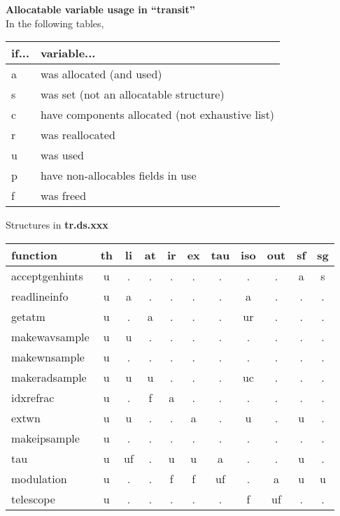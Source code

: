 \documentclass{article}
\begin{document}
\begin{center}
{\large {\bf Allocatable variable usage in ``transit''}}\\
\vfill
In the following tables, \\
\begin{tabular}{ll}
if... & variable...\\
\hline
a & was allocated (and used) \\
s & was set (not an allocatable structure)\\
c & have components allocated (not exhaustive list) \\
r & was reallocated \\
u & was used \\
p & have non-allocables fields in use \\
f & was freed \\
\end{tabular}
\end{center}

\vfill

\begin{center}
{\large Structures in {\bf tr.ds.xxx}}\\[.5cm]
\begin{tabular}{l|cccccccccc}
function
  & th & li & at & ir & ex & tau & iso & out & sf & sg \\
\hline
acceptgenhints
  & u  & .  & .  & .  & .  & .   & .   & .   & a  & s  \\
readlineinfo
  & u  & a  & .  & .  & .  & .   & a   & .   & .  & .  \\
getatm
  & u  & .  & a  & .  & .  & .   & ur  & .   & .  & .  \\
makewavsample
  & u  & u  & .  & .  & .  & .   & .   & .   & .  & .  \\
makewnsample
  & u  & .  & .  & .  & .  & .   & .   & .   & .  & .  \\
makeradsample
  & u  & u  & u  & .  & .  & .   & uc  & .   & .  & .  \\
idxrefrac
  & u  & .  & f  & a  & .  & .   & .   & .   & .  & .  \\
extwn
  & u  & u  & .  & .  & a  & .   & u   & .   & u  & .  \\
makeipsample
  & u  & .  & .  & .  & .  & .   & .   & .   & .  & .  \\
tau
  & u  & uf & .  & u  & u  & a   & .   & .   & u  & .  \\
modulation
  & u  & .  & .  & f  & f  & uf  & .   & a   & u  & u  \\
telescope
  & u  & .  & .  & .  & .  & .   & f   & uf  & .  & .  \\
\hline
\end{tabular}
\end{center}
\end{document}
